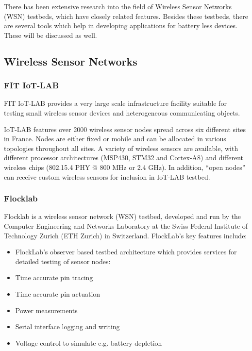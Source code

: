 \documentclass[]{article}
\begin{document}
There has been extensive research into the field of Wireless Sensor Networks (WSN) testbeds, which have closely related features. Besides these testbeds, there are several tools which help in developing applications for battery less devices. These will be discussed as well.

\subsection{Wireless Sensor Networks}

\subsubsection{FIT IoT-LAB}
FIT IoT-LAB \cite{FIT-IoT} provides a very large scale infrastructure facility suitable for testing small wireless sensor devices and heterogeneous communicating objects.

IoT-LAB features over 2000 wireless sensor nodes spread across six different sites in France.  Nodes are either fixed or mobile and can be allocated in various topologies throughout all sites.  A variety of wireless sensors are available, with different processor architectures (MSP430, STM32 and Cortex-A8) and different wireless chips (802.15.4 PHY @ 800 MHz or 2.4 GHz).  In addition, “open nodes” can receive custom wireless sensors for inclusion in IoT-LAB testbed.

\subsubsection{Flocklab}

Flocklab \cite{flocklab} is a wireless sensor network (WSN) testbed, developed and run by the ​Computer Engineering and Networks Laboratory at the ​Swiss Federal Institute of Technology Zurich (ETH Zurich) in Switzerland. FlockLab's key features include:
\begin{itemize}
	\item FlockLab's observer based testbed architecture which provides services for detailed testing of sensor nodes:
	\item Time accurate pin tracing
	\item Time accurate pin actuation
	\item Power measurements
	\item Serial interface logging and writing
	\item Voltage control to simulate e.g. battery depletion
\end{itemize}
\end{document}
